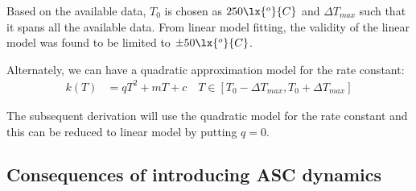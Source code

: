 Based on the available data, $T_0$ is chosen as $250 \lx{^o}{C}$ and $\Delta T_{max}$ such that it spans all the
available data. From linear model fitting, the validity of the linear model was found to be limited to $\pm 50
\lx{^o}{C}$.

Alternately, we can have a quadratic approximation model for the rate constant:
\begin{align}
    k(T) &= q T^2 + m T + c \quad T \in [T_0 - \Delta T_{max}, T_0 + \Delta T_{max}]
\end{align}

The subsequent derivation will use the quadratic model for the rate constant and this can be reduced to linear model by
putting $q = 0$.


\subsection{Consequences of introducing ASC dynamics}
